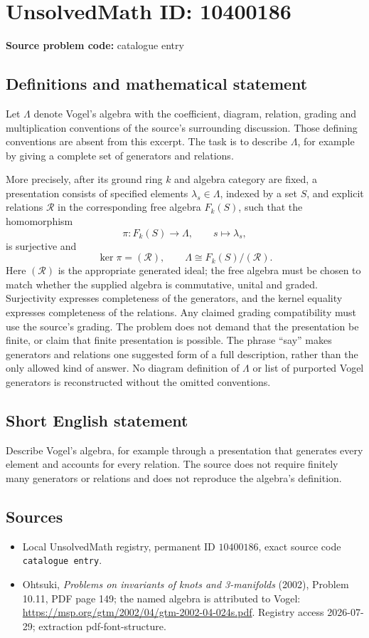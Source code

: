 \documentclass[11pt]{article}
\begin{document}
\section*{UnsolvedMath ID: 10400186}
\textbf{Source problem code:} catalogue entry
\subsection{Definitions and mathematical statement}
Let \(\Lambda\) denote Vogel's algebra with the coefficient, diagram, relation, grading and multiplication conventions of the source's surrounding discussion. Those defining conventions are absent from this excerpt. The task is to describe \(\Lambda\), for example by giving a complete set of generators and relations.

More precisely, after its ground ring \(k\) and algebra category are fixed, a presentation consists of specified elements \(\lambda_s\in\Lambda\), indexed by a set \(S\), and explicit relations \(\mathcal R\) in the corresponding free algebra \(F_k(S)\), such that the homomorphism
\[\pi:F_k(S)\longrightarrow\Lambda,\qquad s\longmapsto\lambda_s,\]
is surjective and
\[\ker\pi=(\mathcal R),\qquad \Lambda\cong F_k(S)/(\mathcal R).\]
Here \((\mathcal R)\) is the appropriate generated ideal; the free algebra must be chosen to match whether the supplied algebra is commutative, unital and graded. Surjectivity expresses completeness of the generators, and the kernel equality expresses completeness of the relations. Any claimed grading compatibility must use the source's grading. The problem does not demand that the presentation be finite, or claim that finite presentation is possible. The phrase ``say'' makes generators and relations one suggested form of a full description, rather than the only allowed kind of answer. No diagram definition of \(\Lambda\) or list of purported Vogel generators is reconstructed without the omitted conventions.
\subsection{Short English statement}
Describe Vogel's algebra, for example through a presentation that generates every element and accounts for every relation. The source does not require finitely many generators or relations and does not reproduce the algebra's definition.
\subsection{Sources}
\begin{itemize}
\item Local UnsolvedMath registry, permanent ID \(10400186\), exact source code \texttt{catalogue entry}.
\item Ohtsuki, \emph{Problems on invariants of knots and 3-manifolds} (2002), Problem 10.11, PDF page 149; the named algebra is attributed to Vogel: \url{https://msp.org/gtm/2002/04/gtm-2002-04-024s.pdf}. Registry access 2026-07-29; extraction pdf-font-structure.
\end{itemize}
\end{document}
